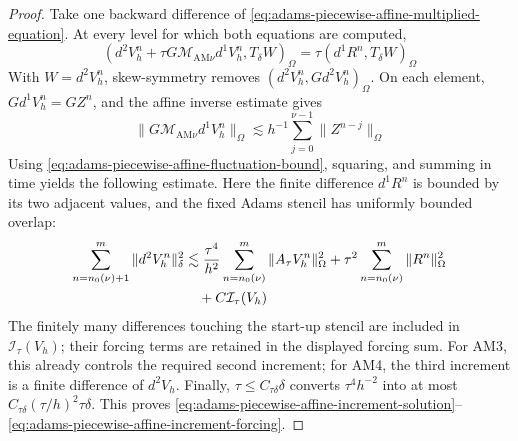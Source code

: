 \documentclass[11pt]{article}
\begin{document}
\begin{proof}
Take one backward difference of
\eqref{eq:adams-piecewise-affine-multiplied-equation}. At every level for
which both equations are computed,
\begin{equation}
(d^2V_h^n+\tau G\mathcal M_{\mathrm{AM}\nu}d^1V_h^n,
T_{\delta}W)_{\Omega}
=\tau(d^1R^n,T_{\delta}W)_{\Omega}
\label{eq:adams-piecewise-affine-differenced-equation}
\end{equation}
With \(W=d^2V_h^n\), skew-symmetry removes
\((d^2V_h^n,Gd^2V_h^n)_{\Omega}\). On each element,
\(Gd^1V_h^n=GZ^n\), and the affine inverse estimate gives
\begin{equation}
\|G\mathcal M_{\mathrm{AM}\nu}d^1V_h^n\|_{\Omega}
\lesssim h^{-1}\sum_{j=0}^{\nu-1}\|Z^{n-j}\|_{\Omega}
\label{eq:adams-piecewise-affine-local-inverse}
\end{equation}
Using \eqref{eq:adams-piecewise-affine-fluctuation-bound}, squaring, and
summing in time yields the following estimate. Here the finite difference
\(d^1R^n\) is bounded by its two adjacent values, and the fixed Adams
stencil has uniformly bounded overlap:
\begin{align}
\sum_{n=n_0(\nu)+1}^m\|d^2V_h^n\|_{\delta}^2
&\lesssim\frac{\tau^4}{h^2}
\sum_{n=n_0(\nu)}^m\|A_{\tau}V_h^n\|_{\Omega}^2
+\tau^2\sum_{n=n_0(\nu)}^m\|R^n\|_{\Omega}^2
\label{eq:adams-piecewise-affine-second-increment-bound}\\
&\quad+C\mathcal I_{\tau}(V_h)
\notag
\end{align}
The finitely many differences touching the start-up stencil are included in
\(\mathcal I_{\tau}(V_h)\); their forcing terms are retained in the displayed
forcing sum. For AM3, this already controls the required second increment;
for AM4, the third increment is a finite difference of \(d^2V_h\). Finally,
\(\tau\le C_{\tau\delta}\delta\) converts
\(\tau^4h^{-2}\) into at most
\(C_{\tau\delta}(\tau/h)^2\tau\delta\). This proves
\eqref{eq:adams-piecewise-affine-increment-solution}--
\eqref{eq:adams-piecewise-affine-increment-forcing}.
\end{proof}

\end{document}

